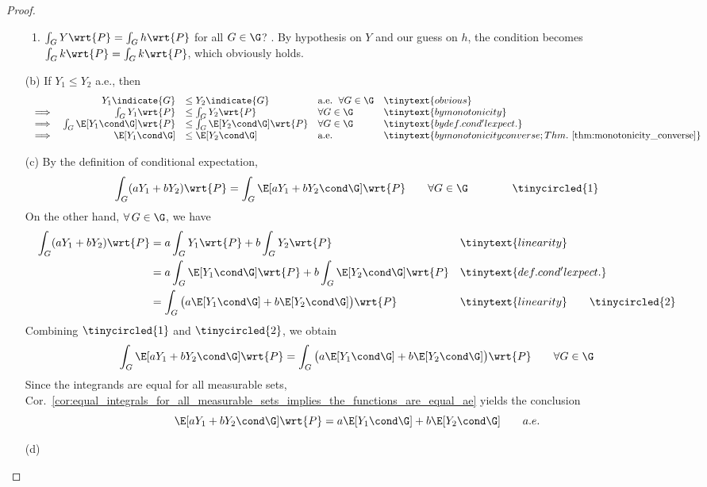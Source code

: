 \documentclass{article} %
\begin{document}
\begin{proof}
\begin{itemize}
\begin{enumerate}
		\item $\int_G Y \wrt{P} =  \int_G h \wrt{P}$ for all $G \in \G$? \greencheck.   By hypothesis on $Y$ and our guess on $h$, the condition becomes $\int_G k \wrt{P} =  \int_G k \wrt{P}$, which obviously holds.
	\end{enumerate} 
\item[(b)] If $Y_1 \leq Y_2$ a.e., then 
\[\begin{array}{rrlll}
& Y_1 \indicate{G} &\leq Y_2 \indicate{G} & \text{a.e. } \, \forall G \in \G  & \tinytext{obvious} \\
\implies & \int_G Y_1 \wrt{P} & \leq  \int_G Y_2 \wrt{P} & \forall G \in \G & \tinytext{by monotonicity} \\
\implies & \int_G \E[Y_1 \cond \G] \wrt{P} & \leq  \int_G \E[Y_2 \cond \G] \wrt{P} &  \forall G \in \G & \tinytext{by def. cond'l expect.} \\
\implies & \E[Y_1 \cond \G]  & \leq  \E[Y_2 \cond \G]  &  \text{a.e.}  & \tinytext{by monotonicity converse; Thm.~\ref{thm:monotonicity_converse}} \\
\end{array}
\]
\item[(c)] 
By the definition  of conditional expectation,
%
\[ \int_G (a Y_1 + b Y_2 ) \wrt{P} = \int_G \E[a Y_1 + b Y_2 \cond \G ]\wrt{P} \quad \quad \forall G \in \G \quad \quad \quad \quad \tinycircled{1} \]
On the other hand, $\forall \, G \in \G$, we have 
\begin{align*}
\int_G (a Y_1 + b Y_2 ) \wrt{P} &= a \int_G Y_1 \wrt{P} + b \int_G Y_2  \wrt{P}  && \tinytext{linearity} \\
&= a \int_G \E[Y_1 \cond \G] \wrt{P} + b \int_G \E[Y_2 \cond \G]  \wrt{P}  && \tinytext{def. cond'l expect.} \\
&= \int_G  \big( a\E[Y_1 \cond \G]  + b \E[Y_2 \cond \G]  \big) \wrt{P}  && \tinytext{linearity} \quad \quad \tinycircled{2} \\  
\end{align*}
Combining $\tinycircled{1}$ and $\tinycircled{2}$, we obtain
\[ \int_G \E[a Y_1 + b Y_2 \cond \G ]\wrt{P}  = \int_G  \big( a\E[Y_1 \cond \G]  + b \E[Y_2 \cond \G]  \big) \wrt{P} \quad \quad \forall G \in \G  \] 
Since the integrands are equal for all measurable sets,  Cor.~\ref{cor:equal_integrals_for_all_measurable_sets_implies_the_functions_are_equal_ae} yields the conclusion
\[ \E[a Y_1 + b Y_2 \cond \G ]\wrt{P}  =  a\E[Y_1 \cond \G]  + b \E[Y_2 \cond \G]   \quad \quad a.e.  \]
\item[(d)]\footnotemark

\end{itemize}
\end{proof}
\end{document}
